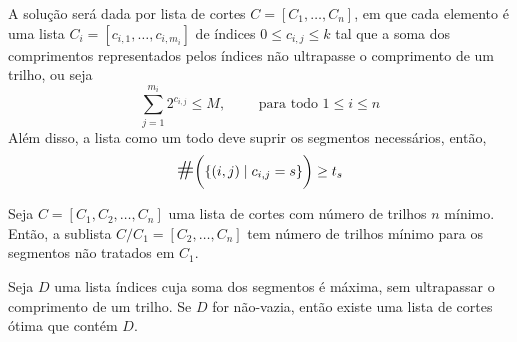 A solução será dada por lista de cortes $C = [C_1, \ldots, C_n]$, em que cada elemento é uma lista $C_i = [c_{i, 1}, \ldots, c_{i, m_i}]$ de índices $0 \leq c_{i, j} \leq k$ tal que a soma dos comprimentos representados pelos índices não ultrapasse o comprimento de um trilho, ou seja
\[
    \sum_{j = 1}^{m_i} 2^{c_{i, j}} \leq M, \qquad \text{ para todo } 1 \leq i \leq n
\]
Além disso, a lista como um todo deve suprir os segmentos necessários, então,
\[
    \scalebox{1.5}{\#}\biggl(\left\{(i, j) \mid c_{i, j} = s\right\}\biggr) \geq t_s
\]

\begin{theorem}
    Seja $C = [C_1, C_2, \ldots, C_n]$ uma lista de cortes com número de trilhos $n$ mínimo. Então, a sublista $C / C_1 = [C_2, \ldots, C_n]$ tem número de trilhos mínimo para os segmentos não tratados em $C_1$.
\end{theorem}

\begin{theorem}
    Seja $D$ uma lista índices cuja soma dos segmentos é máxima, sem ultrapassar o comprimento de um trilho. Se $D$ for não-vazia, então existe uma lista de cortes ótima que contém $D$.
\end{theorem}
